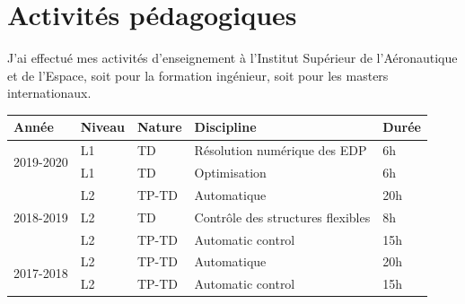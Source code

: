 \documentclass[12pt,a4paper,sans]{moderncv} %
\begin{document}


\section{Activités pédagogiques}
J'ai effectué mes activités d'enseignement à l'Institut Supérieur de l'Aéronautique et de l'Espace, soit pour la formation ingénieur, soit pour les masters internationaux.

\begin{tabular}{p{}p{}p{}p{}p{}}
	\hline
	Année & Niveau & Nature  & Discipline & Durée  \\
	\hline
	\multirow{2}{*}{2019-2020} & L1 & TD &  Résolution numérique des EDP & 6h \\
							   & L1 & TD &  Optimisation & 6h \\
	\hline
	\multirow{3}{*}{2018-2019} & L2  & TP-TD  & Automatique & 20h \\
							   & L2  & TD     & Contrôle des structures flexibles & 8h \\
							   & L2  & TP-TD  & Automatic control & 15h \\
	\hline
	\multirow{2}{*}{2017-2018} & L2  & TP-TD  & Automatique & 20h \\
							   & L2  & TP-TD  & Automatic control & 15h \\				   
	\hline
\end{tabular}
\end{document}
